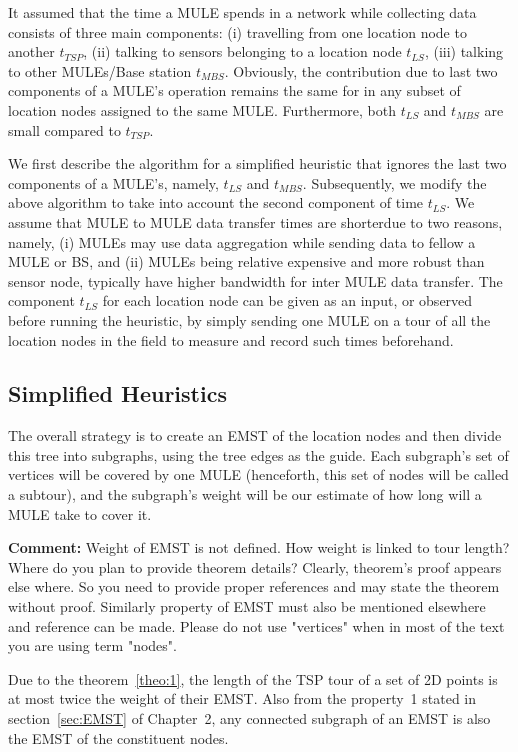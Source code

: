 It assumed that the time a MULE spends in a network while collecting data
consists of three main components: (i) travelling from one location node to another $t_{TSP}$, (ii) talking to sensors belonging to a location node $t_{LS}$, (iii) talking to other MULEs/Base station $t_{MBS}$. Obviously, the 
contribution due to last two components of a MULE's operation remains
the same for in any subset of location nodes assigned to the same MULE. 
Furthermore, both $t_{LS}$ and $t_{MBS}$ are small compared to $t_{TSP}$. 

We first describe the algorithm for a simplified heuristic that ignores the last two components of a MULE's, namely, $t_{LS}$ and $t_{MBS}$. Subsequently, we modify the above algorithm to take into account the second component of time $t_{LS}$. We assume that MULE to MULE data transfer times are shorterdue to two reasons, namely, (i) MULEs may use data aggregation while sending data to fellow a MULE or BS, and (ii) MULEs being relative expensive and more robust than sensor node, typically have higher bandwidth for inter MULE data transfer. The component $t_{LS}$ for each location node can be given as an input, or observed before running the heuristic, by simply sending one MULE on a tour of all the location nodes in the field to measure and record such times beforehand.


\subsection{Simplified Heuristics}

The overall strategy is to create an EMST of the location nodes and then divide this tree into subgraphs, using the tree edges as the guide. Each subgraph's set of vertices will be covered by one MULE (henceforth, this set of nodes will be called a subtour), and the subgraph's weight will be our estimate of how long will a MULE take to cover it.

{\bf Comment:} Weight of EMST is not defined. How weight is linked to
tour length? Where do you plan to provide theorem details? Clearly,
theorem's proof appears else where. So you need to provide proper
references and may state the theorem without proof. Similarly property
of EMST must also be mentioned elsewhere and reference can be made.
Please do not use "vertices" when in most of the text you are using
term "nodes".

Due to the theorem~\ref{theo:1}, the length of the TSP tour of a set of 2D points is at most twice the weight of their EMST. Also from the property~1
stated in section~\ref{sec:EMST} of Chapter~2, any connected subgraph of an EMST is also the EMST of the constituent nodes.

